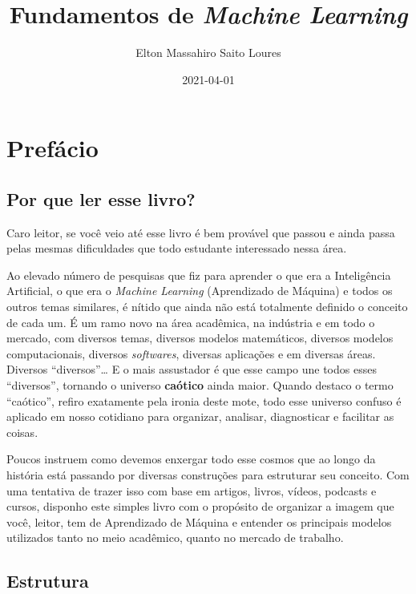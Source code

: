 \documentclass[
  openany]{book}
\title{Fundamentos de \emph{Machine Learning}}
\author{Elton Massahiro Saito Loures}
\date{2021-04-01}
\begin{document}
\maketitle

\renewcommand*\contentsname{Sumário}
{
\setcounter{tocdepth}{1}
\tableofcontents
}
\hypertarget{prefuxe1cio}{%
\chapter*{Prefácio}\label{prefuxe1cio}}

\hypertarget{por-que-ler-esse-livro}{%
\section{Por que ler esse livro?}\label{por-que-ler-esse-livro}}

Caro leitor, se você veio até esse livro é bem provável que passou e ainda passa pelas mesmas dificuldades que todo estudante interessado nessa área.

Ao elevado número de pesquisas que fiz para aprender o que era a Inteligência Artificial, o que era o \emph{Machine Learning} (Aprendizado de Máquina) e todos os outros temas similares, é nítido que ainda não está totalmente definido o conceito de cada um. É um ramo novo na área acadêmica, na indústria e em todo o mercado, com diversos temas, diversos modelos matemáticos, diversos modelos computacionais, diversos \emph{softwares}, diversas aplicações e em diversas áreas. Diversos ``diversos''\ldots{} E o mais assustador é que esse campo une todos esses ``diversos'', tornando o universo \textbf{caótico} ainda maior. Quando destaco o termo ``caótico'', refiro exatamente pela ironia deste mote, todo esse universo confuso é aplicado em nosso cotidiano para organizar, analisar, diagnosticar e facilitar as coisas.

Poucos instruem como devemos enxergar todo esse cosmos que ao longo da história está passando por diversas construções para estruturar seu conceito. Com uma tentativa de trazer isso com base em artigos, livros, vídeos, podcasts e cursos, disponho este simples livro com o propósito de organizar a imagem que você, leitor, tem de Aprendizado de Máquina e entender os principais modelos utilizados tanto no meio acadêmico, quanto no mercado de trabalho.

\hypertarget{estrutura}{%
\section{Estrutura}\label{estrutura}}
\end{document}
